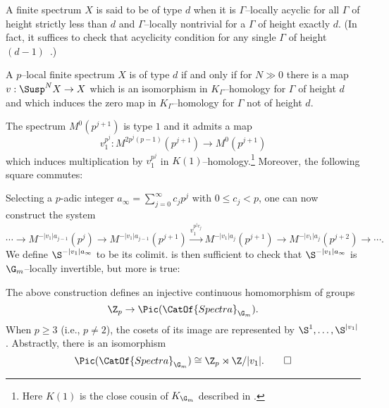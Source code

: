 \begin{definition}
A finite spectrum $X$ is said to be of type $d$ when it is $\Gamma$--locally acyclic for all $\Gamma$ of height strictly less than $d$ and $\Gamma$--locally nontrivial for a $\Gamma$ of height exactly $d$.  (In fact, it suffices to check that acyclicity condition for any single $\Gamma$ of height $(d-1)$~\cite[Theorem 2.11]{RavenelLocalizationWRTPeriodic}.)
\end{definition}

\begin{theorem}
A $p$--local finite spectrum $X$ is of type $d$ if and only if for $N \gg 0$ there is a map $v: \Susp^N X \to X$ which is an isomorphism in $K_\Gamma$--homology for $\Gamma$ of height $d$ and which induces the zero map in $K_\Gamma$--homology for $\Gamma$ not of height $d$.
\end{theorem}

\begin{lemma}\label{AdamsSelfMaps}
The spectrum $M^0(p^{j+1})$ is type $1$ and it admits a map \[v_1^{p^j}: M^{2p^j(p-1)}(p^{j+1}) \to M^0(p^{j+1})\] which induces multiplication by $v_1^{p^j}$ in $K(1)$--homology.\footnote{Here $K(1)$ is the close cousin of $K_{\G_m}$ described in .} Moreover, the following square commutes:
\begin{center}
\end{center}
\end{lemma}

Selecting a $p$-adic integer $a_\infty = \sum_{j=0}^\infty c_j p^j$ with $0 \le c_j < p$, one can now construct the system \[\cdots \to M^{-|v_1| a_{j-1}}(p^j) \to M^{-|v_1| a_{j-1}}(p^{j+1}) \xrightarrow{v_1^{p^j c_j}} M^{-|v_1| a_j}(p^{j+1}) \to M^{-|v_1| a_j}(p^{j+2}) \to \cdots.\] We define $\S^{-|v_1|a_\infty}$ to be its colimit.   is then sufficient to check that $\S^{-|v_1| a_\infty}$ is $\G_m$--locally invertible, but more is true:
\begin{lemma}\label{padicPicElements}
The above construction defines an injective continuous homomorphism of groups \[\Z_p \to \Pic(\CatOf{Spectra}_{\G_m}).\]  When $p \ge 3$ (i.e., $p \ne 2$), the cosets of its image are represented by $\S^1, \ldots, \S^{|v_1|}$.  Abstractly, there is an isomorphism \[\Pic(\CatOf{Spectra}_{\G_m}) \cong \Z_p \rtimes \Z/|v_1|. \qed\]
\end{lemma}

